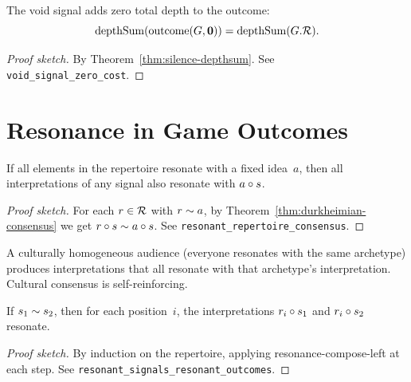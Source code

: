 \begin{theorem}
\label{thm:void-zero-cost}
The void signal adds zero total depth to the outcome:
\[
  \operatorname{depthSum}(\operatorname{outcome}(G, \mathbf{0}))
  = \operatorname{depthSum}(G.\mathcal{R}).
\]
\end{theorem}

\begin{proof}[Proof sketch]
By Theorem~\ref{thm:silence-depthsum}.  See \texttt{void\_signal\_zero\_cost}.
\end{proof}

\section{Resonance in Game Outcomes}
\label{sec:ch2:resonance}

\begin{theorem}
\label{thm:resonant-repertoire}
If all elements in the repertoire resonate with a fixed idea~$a$, then
all interpretations of any signal also resonate with $a \circ s$.
\end{theorem}

\begin{proof}[Proof sketch]
For each $r \in \mathcal{R}$ with $r \sim a$, by Theorem~\ref{thm:durkheimian-consensus}
we get $r \circ s \sim a \circ s$.
See \texttt{resonant\_repertoire\_consensus}.
\end{proof}

\begin{remark}
A culturally homogeneous audience (everyone resonates with the same
archetype) produces interpretations that all resonate with that
archetype's interpretation.  Cultural consensus is self-reinforcing.
\end{remark}

\begin{theorem}
\label{thm:resonant-signals-outcomes}
If $s_1 \sim s_2$, then for each position~$i$, the interpretations
$r_i \circ s_1$ and $r_i \circ s_2$ resonate.
\end{theorem}

\begin{proof}[Proof sketch]
By induction on the repertoire, applying resonance-compose-left at each
step.  See \texttt{resonant\_signals\_resonant\_outcomes}.
\end{proof}

